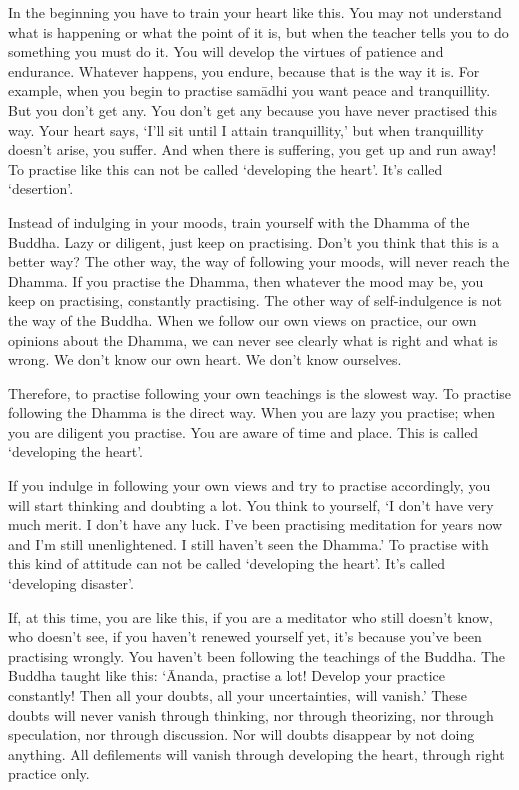 In the beginning you have to train your heart like this. You may not understand what is happening or what the point of it is, but when the teacher tells you to do something you must do it. You will develop the virtues of patience and endurance. Whatever happens, you endure, because that is the way it is. For example, when you begin to practise sam\=adhi you want peace and tranquillity. But you don't get any. You don't get any because you have never practised this way. Your heart says, `I'll sit until I attain tranquillity,' but when tranquillity doesn't arise, you suffer. And when there is suffering, you get up and run away! To practise like this can not be called `developing the heart'. It's called `desertion'. 

Instead of indulging in your moods, train yourself with the Dhamma of the Buddha. Lazy or diligent, just keep on practising. Don't you think that this is a better way? The other way, the way of following your moods, will never reach the Dhamma. If you practise the Dhamma, then whatever the mood may be, you keep on practising, constantly practising. The other way of self-indulgence is not the way of the Buddha. When we follow our own views on practice, our own opinions about the Dhamma, we can never see clearly what is right and what is wrong. We don't know our own heart. We don't know ourselves. 

Therefore, to practise following your own teachings is the slowest way. To practise following the Dhamma is the direct way. When you are lazy you practise; when you are diligent you practise. You are aware of time and place. This is called `developing the heart'. 

If you indulge in following your own views and try to practise accordingly, you will start thinking and doubting a lot. You think to yourself, `I don't have very much merit. I don't have any luck. I've been practising meditation for years now and I'm still unenlightened. I still haven't seen the Dhamma.' To practise with this kind of attitude can not be called `developing the heart'. It's called `developing disaster'. 

If, at this time, you are like this, if you are a meditator who still doesn't know, who doesn't see, if you haven't renewed yourself yet, it's because you've been practising wrongly. You haven't been following the teachings of the Buddha. The Buddha taught like this: `\=Ananda, practise a lot! Develop your practice constantly! Then all your doubts, all your uncertainties, will vanish.' These doubts will never vanish through thinking, nor through theorizing, nor through speculation, nor through discussion. Nor will doubts disappear by not doing anything. All defilements will vanish through developing the heart, through right practice only. 

